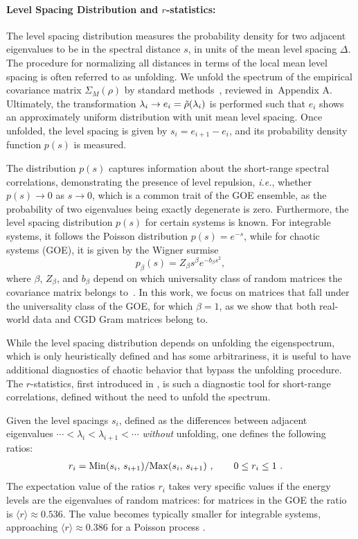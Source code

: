 \documentclass{article}
\begin{document}
%
\paragraph{Level Spacing Distribution and $r$-statistics:}
The level spacing distribution measures the probability density for two adjacent eigenvalues to be in the spectral distance $s$, in units of the mean level spacing $\Delta$.
The procedure for normalizing all distances in terms of the local mean level spacing is often referred to as unfolding.
We unfold the spectrum of the empirical covariance matrix $\Sigma_M(\rho)$ by standard methods~\citep{Kim_2023}, reviewed in~Appendix A.
Ultimately, the transformation $\lambda_i \to e_i = \Tilde{\rho}(\lambda_i) $ is performed such that $e_i$ shows an approximately uniform distribution with unit mean level spacing.
Once unfolded, the level spacing is given by $s_{i} = e_{i+1}-e_i$, and its probability density function $p(s)$ is measured. 

The distribution $p(s)$ captures information about the short-range spectral correlations, demonstrating the presence of level repulsion, \textit{i.e.}, whether $p(s)\rightarrow 0$ as $s\rightarrow 0$, which is a common trait of the GOE ensemble, as the probability of two eigenvalues being exactly degenerate is zero.
Furthermore, the level spacing distribution $p(s)$ for certain systems is known. For integrable systems, it follows the Poisson distribution $p(s) = e^{-s}$, while for chaotic systems (GOE), it is given by the Wigner surmise
\begin{equation}
p_{\beta}(s) = Z_\beta{s^{\beta} e^{-b_{\beta}s^2}},
\label{Wigner}
\end{equation}
where $\beta$, $Z_\beta$, and $b_\beta$ depend on which universality class of random matrices the covariance matrix belongs to~\citep{mehta_book}. In this work, we focus on matrices that fall under the universality class of the GOE, for which $\beta=1$, as we show that both real-world data and CGD Gram matrices belong to.


While the level spacing distribution depends on unfolding the eigenspectrum, which is only heuristically defined and has some arbitrariness, it is useful to have additional diagnostics of chaotic behavior that bypass the unfolding procedure. The $r$-statistics, first introduced in \citet{huse_r_stat}, is such a diagnostic tool for short-range correlations, defined without the need to unfold the spectrum.

Given the level spacings $s_i$, defined as the differences between adjacent eigenvalues $\cdots < \lambda_i < \lambda_{i+1} < \cdots$ {\it without} unfolding, one defines the following ratios:
\begin{align}
\label{eq:ri_definition}
& r_i =
{{\rm Min}(s_i, \, s_{i+1})}/
{{\rm Max}(s_i, \, s_{i+1})}
\ ,  \qquad
0\leq r_i \leq 1 \ .
\end{align}
The expectation value of the ratios $r_i$ takes very specific values if the energy levels are the eigenvalues of random matrices: for matrices in the GOE the ratio is $\langle r\rangle \approx 0.536$.
The value becomes typically smaller for integrable systems, approaching $\langle r \rangle \approx 0.386$ for a Poisson process \citep{r_ratios_theory_values}.
\end{document}

